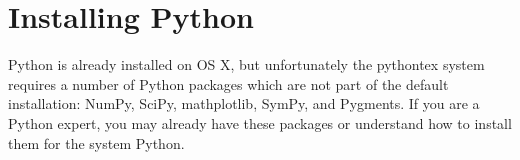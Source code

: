 \documentclass[11pt, oneside]{amsart}
\begin{document}
%
%
%
%
%
%
%
%
%
%

\section{Installing Python}
Python is already installed on OS X, but unfortunately the pythontex system requires
a number of Python packages which are not part of the default installation: NumPy, SciPy, mathplotlib, SymPy, and Pygments. If you are a Python expert, you may already have these packages or understand how to install them for the system Python.
\end{document}

